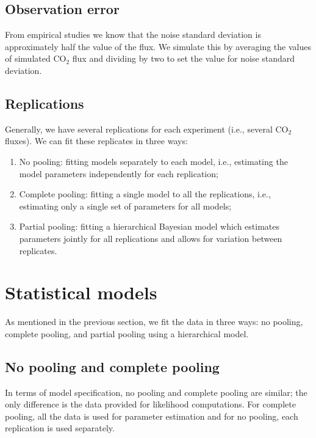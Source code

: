 \documentclass[10pt,a4paper]{article}
\begin{document}
\subsection{Observation error}
From empirical studies we know that the noise standard deviation is approximately half the value of the flux.  We simulate this by averaging the values of simulated CO$_2$ flux and dividing by two to set the value for noise standard deviation. 

\subsection{Replications}
Generally, we have several replications for each experiment (i.e., several CO$_2$ fluxes). We can fit these replicates in three ways:
\begin{enumerate}
\item No pooling: fitting models separately to each model, i.e., estimating the model parameters independently for each replication;
\item Complete pooling: fitting a single model to all the replications, i.e., estimating only a single set of parameters for all models;
\item Partial pooling: fitting a hierarchical Bayesian model which estimates parameters jointly for all replications and allows for variation between replicates.
\end{enumerate}
\section{Statistical models}
As mentioned in the previous section, we fit the data in three ways: no pooling, complete pooling, and partial pooling using a hierarchical model. 

\subsection{No pooling and complete pooling} 
In terms of model specification, no pooling and complete pooling are similar; the only difference is the data provided for likelihood computations. For complete pooling, all the data is used for parameter estimation and for no pooling, each replication is used separately. 
\end{document}
